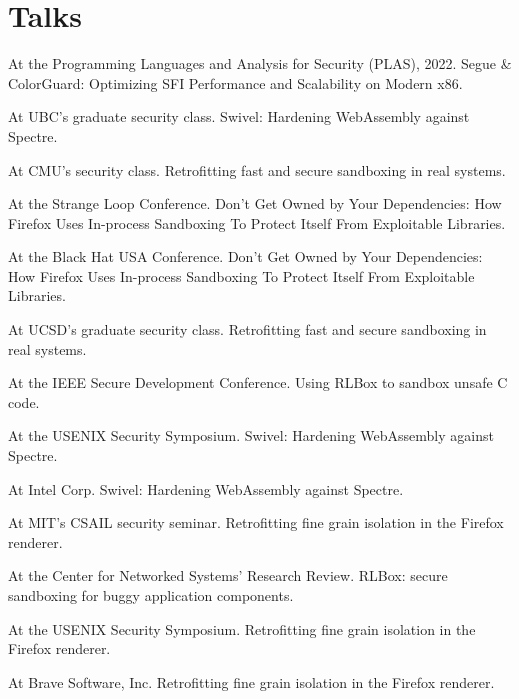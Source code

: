 \section{Talks}

{ At the Programming Languages and Analysis for Security (PLAS), 2022. Segue \&
ColorGuard: Optimizing SFI Performance and Scalability on Modern x86. }

{ At UBC's graduate security class. Swivel: Hardening WebAssembly against
Spectre. }

{ At CMU's security class. Retrofitting fast and secure sandboxing in real
systems. }

{ At the Strange Loop Conference. Don't Get Owned by Your Dependencies: How
Firefox Uses In-process Sandboxing To Protect Itself From Exploitable Libraries. }

{ At the Black Hat USA Conference. Don't Get Owned by Your Dependencies: How
Firefox Uses In-process Sandboxing To Protect Itself From Exploitable Libraries. }

{ At UCSD's graduate security class. Retrofitting fast and secure sandboxing in
real systems. }

{ At the IEEE Secure Development Conference. Using RLBox to sandbox
unsafe C code. }

{ At the USENIX Security Symposium. Swivel: Hardening WebAssembly against
Spectre. }

{ At Intel Corp. Swivel: Hardening WebAssembly against Spectre. }

{ At MIT's CSAIL security seminar. Retrofitting fine grain isolation in the
Firefox renderer. }

{ At the Center for Networked Systems' Research Review. RLBox: secure sandboxing for buggy application
components.  }

{ At the USENIX Security Symposium. Retrofitting fine grain isolation in the
Firefox renderer. }

{ At Brave Software, Inc. Retrofitting fine grain isolation in the Firefox
renderer. }
